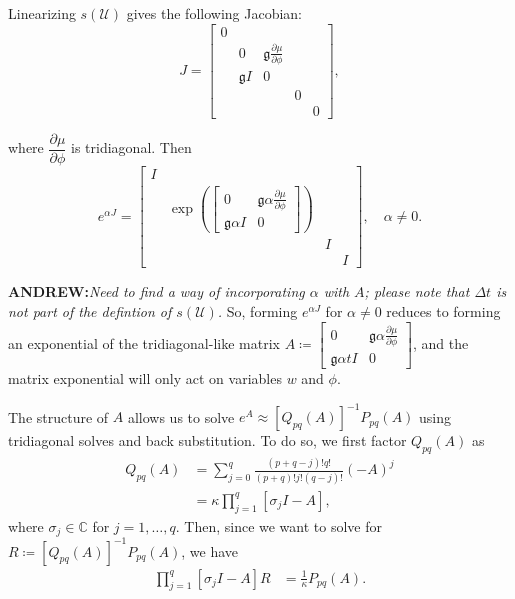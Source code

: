 \documentclass{csri19}
\newcommand{\CFKg}{\mathfrak{g}}
\newcommand{\CFKU}{\mathcal{U}}
\newcommand{\A}[1]{\textbf{ANDREW:}\textit{#1}}
\begin{document}
Linearizing $s(\CFKU)$ gives the following Jacobian:
\[ J = \begin{bmatrix}
0&                  &                                                   &  & \\
 & 0                & \CFKg \frac{\partial \mu}{\partial \phi} &  & \\
 & \CFKg  I & 0                                                 &  & \\
 &                  &                                                   &0 & \\
 &                  &                                                   &  &0\end{bmatrix},\]

where $\dfrac{\partial \mu}{\partial \phi}$ is tridiagonal. Then
\[ e^{\alpha J} = \begin{bmatrix}
I&                                                                     &  & \\
 & \exp\left(\begin{bmatrix}0 & \CFKg \alpha \frac{\partial \mu}{\partial \phi} \\ 
  \CFKg \alpha I & 0     \end{bmatrix}\right)     &  & \\                                      
 &                                                                     &I & \\
 &                                                                     &  &I\end{bmatrix}, \quad \alpha \neq 0.\]

\A{Need to find a way of incorporating $\alpha$ with $A$; please note that $\Delta t$ is not part of the defintion of $s(\mathcal{U})$.}
So, forming $e^{\alpha J}$ for $\alpha \neq 0$ reduces to forming an exponential of the 
tridiagonal-like matrix $A \coloneqq 
\begin{bmatrix}
   0              & \CFKg \alpha \frac{\partial \mu}{\partial \phi} \\
 \CFKg \alpha t I & 0  \end{bmatrix}$, and the matrix exponential will 
only act on variables $w$ and $\phi$. 

The structure of $A$ allows us to solve 
$e^A \approx \left[Q_{pq}(A)\right]^{-1}P_{pq}(A)$ using tridiagonal solves 
and back substitution. To do so, we first factor $Q_{pq}(A)$ as
\begin{align*}
Q_{pq}(A) &= \sum_{j=0}^q\frac{(p+q-j)!q!}{(p+q)!j!(q-j)!}(-A)^j\\
          &= \kappa\prod_{j=1}^q\left[\sigma_jI-A\right],
\end{align*}
where $\sigma_j\in \mathbb{C}$ for $j=1,\dots,q$.  Then, since we want to solve for 
$R \coloneqq \left[Q_{pq}(A)\right]^{-1}P_{pq}(A)$, we have
\begin{align*}
\prod_{j=1}^q\left[\sigma_jI-A\right]R &= \frac{1}{\kappa}P_{pq}(A).
\end{align*}
\end{document}
